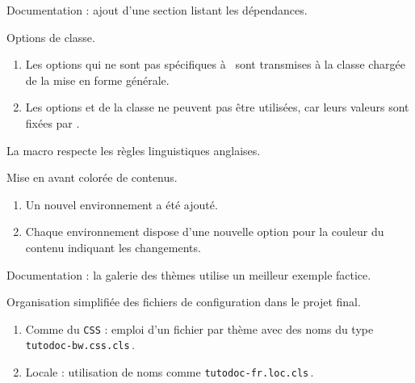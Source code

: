 \documentclass{tutodoc}
\begin{document}
\begin{tdocnew}
	\item Documentation : ajout d'une section listant les dépendances.

	\item Options de classe.
	\begin{enumerate}
		\item Les options qui ne sont pas spécifiques à \thisproj\ sont transmises à la classe chargée de la mise en forme générale.

		\item Les options  et  de la classe  ne peuvent pas être utilisées, car leurs valeurs sont fixées par \thisproj.
	\end{enumerate}

	\item La macro  respecte les règles linguistiques anglaises.

	\item Mise en avant colorée de contenus.
	\begin{enumerate}
		\item Un nouvel environnement  a été ajouté.

		\item Chaque environnement dispose d'une nouvelle option  pour la couleur du contenu indiquant les changements.
	\end{enumerate}
\end{tdocnew}


\begin{tdocupdate}
	\item Documentation : la galerie des thèmes utilise un meilleur exemple factice.
\end{tdocupdate}



\begin{tdoctech}
	\item Organisation simplifiée des fichiers de configuration dans le projet final.
	\begin{enumerate}
		\item Comme du \texttt{CSS} : emploi d'un fichier par thème avec des noms du type \texttt{tutodoc-bw.css.cls}\,.


		\item Locale : utilisation de noms comme \texttt{tutodoc-fr.loc.cls}\,.
	\end{enumerate}
\end{tdoctech}
\end{document}
